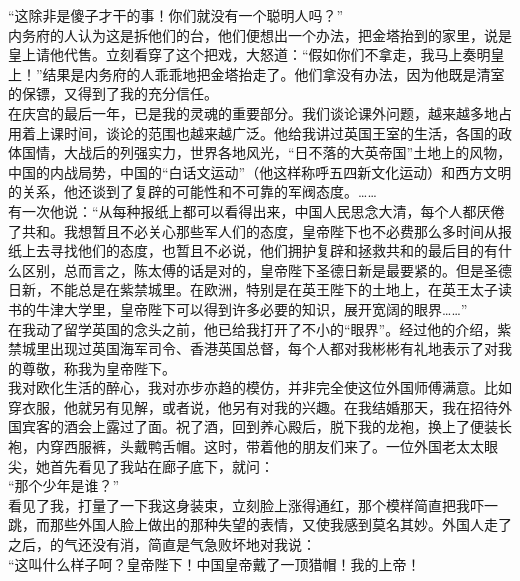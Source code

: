 “这除非是傻子才干的事！你们就没有一个聪明人吗？”\\

内务府的人认为这是拆他们的台，他们便想出一个办法，把金塔抬到的家里，说是皇上请他代售。立刻看穿了这个把戏，大怒道：“假如你们不拿走，我马上奏明皇上！”结果是内务府的人乖乖地把金塔抬走了。他们拿没有办法，因为他既是清室的保镖，又得到了我的充分信任。\\

在庆宫的最后一年，已是我的灵魂的重要部分。我们谈论课外问题，越来越多地占用着上课时间，谈论的范围也越来越广泛。他给我讲过英国王室的生活，各国的政体国情，大战后的列强实力，世界各地风光，“日不落的大英帝国”土地上的风物，中国的内战局势，中国的“白话文运动”（他这样称呼五四新文化运动）和西方文明的关系，他还谈到了复辟的可能性和不可靠的军阀态度。……\\

有一次他说：“从每种报纸上都可以看得出来，中国人民思念大清，每个人都厌倦了共和。我想暂且不必关心那些军人们的态度，皇帝陛下也不必费那么多时间从报纸上去寻找他们的态度，也暂且不必说，他们拥护复辟和拯救共和的最后目的有什么区别，总而言之，陈太傅的话是对的，皇帝陛下圣德日新是最要紧的。但是圣德日新，不能总是在紫禁城里。在欧洲，特别是在英王陛下的土地上，在英王太子读书的牛津大学里，皇帝陛下可以得到许多必要的知识，展开宽阔的眼界……”\\

在我动了留学英国的念头之前，他已给我打开了不小的“眼界”。经过他的介绍，紫禁城里出现过英国海军司令、香港英国总督，每个人都对我彬彬有礼地表示了对我的尊敬，称我为皇帝陛下。\\

我对欧化生活的醉心，我对亦步亦趋的模仿，并非完全使这位外国师傅满意。比如穿衣服，他就另有见解，或者说，他另有对我的兴趣。在我结婚那天，我在招待外国宾客的酒会上露过了面。祝了酒，回到养心殿后，脱下我的龙袍，换上了便装长袍，内穿西服裤，头戴鸭舌帽。这时，带着他的朋友们来了。一位外国老太太眼尖，她首先看见了我站在廊子底下，就问：\\

“那个少年是谁？”\\

看见了我，打量了一下我这身装束，立刻脸上涨得通红，那个模样简直把我吓一跳，而那些外国人脸上做出的那种失望的表情，又使我感到莫名其妙。外国人走了之后，的气还没有消，简直是气急败坏地对我说：\\

“这叫什么样子呵？皇帝陛下！中国皇帝戴了一顶猎帽！我的上帝！

